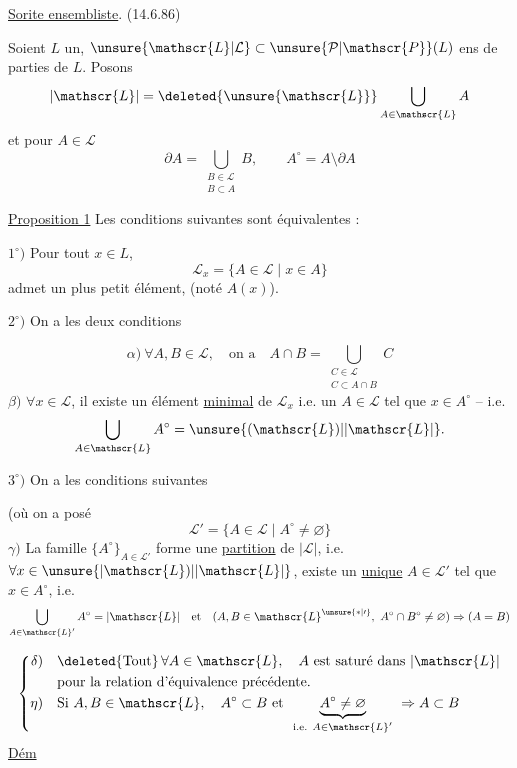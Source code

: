 \uline{Sorite ensembliste}. \quad (14.6.86)

Soient $L$ un, $\unsure{\mathscr{L}|\mathcal{L}}\subset\unsure{\mathcal{P}|\mathscr{P}}(L)$ ens de parties de $L$. Posons
\[
|\mathscr{L}|=\deleted{\unsure{\mathscr{L}}}\bigcup_{A\in\mathscr{L}}A
\]
et pour $A\in\mathscr{L}$
\[
\partial A=\bigcup_{\substack{B\in\mathscr{L}\\B\subset A}}B,\qquad A^\circ=A\setminus\partial A
\]

\uline{Proposition 1} Les conditions suivantes sont équivalentes :

$1^\circ)$ Pour tout $x\in L$,  
\[
\mathscr{L}_x=\{A\in\mathscr{L}\mid x\in A\}
\]
admet un plus petit élément, (noté $A(x)$).

$2^\circ)$ On a les deux conditions

\[
\alpha)\ \forall A,B\in\mathscr{L},\quad\text{on a}\quad
 A\cap B=\bigcup_{\substack{C\in\mathscr{L}\\C\subset A\cap B}}C
\]
$\beta)$ $\forall x\in\mathscr{L}$, il existe un élément \uline{minimal} de $\mathscr{L}_x$ i.e. un $A\in\mathscr{L}$ tel que $x\in A^\circ$ -- i.e.
\[
\bigcup_{A\in\mathscr{L}}A^\circ=\unsure{(\mathscr{L})|\lvert\mathscr{L}\rvert}.
\]

$3^\circ)$ On a les  conditions suivantes

(où  on a posé
\[
\mathscr{L}'=\{A\in\mathscr{L}\mid A^\circ\ne\varnothing\}
\]
$\gamma)$ La famille $\{A^\circ\}_{A\in\mathscr{L}'}$ forme une \uline{partition} de $|\mathscr{L}|$, i.e. $\forall x\in\unsure{\lvert\mathscr{L})|\lvert\mathscr{L}\rvert}$, \deleted{\unsure{\ensuremath{\exists!}}} existe un \uline{unique} $A\in\mathscr{L}'$ tel que $x\in A^\circ$, i.e.
\[
\bigcup_{A\in\mathscr{L}'} A^\circ=|\mathscr{L}|\quad\text{et}\quad
(A,B\in\mathscr{L}^{\unsure{*|\prime}},\ A^\circ\cap B^\circ\ne\varnothing)\Rightarrow(A=B)
\]

\[
\left\{\begin{aligned}
\delta)&\quad \deleted{\text{Tout}}\,\forall A\in\mathscr{L},\quad A\ \text{est saturé dans }|\mathscr{L}|\\
 &\quad\text{pour la relation d'équivalence précédente.}\\
\eta)&\quad\text{Si } A,B\in\mathscr{L},\quad A^\circ\subset B\ \text{et }\
 \underset{\text{i.e. } A\in\mathscr{L}'}{\underbrace{A^\circ\ne\varnothing}}\ \Rightarrow A\subset B
\end{aligned}\right.
\]
\uline{Dém}

